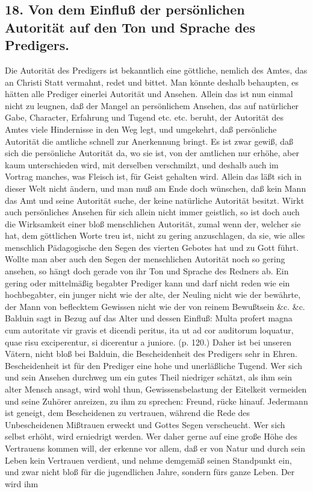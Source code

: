 \subsection*{18. Von dem Einfluß der persönlichen Autorität auf den Ton und Sprache des Predigers.}

Die Autorität des Predigers ist bekanntlich eine göttliche, nemlich des Amtes, das an Christi Statt vermahnt, redet und bittet. Man könnte deshalb behaupten, es hätten alle Prediger einerlei Autorität und Ansehen. Allein das ist nun einmal nicht zu leugnen, daß der Mangel an persönlichem Ansehen, das auf natürlicher Gabe, Character, Erfahrung und Tugend etc. etc. beruht, der Autorität des Amtes viele Hindernisse in den Weg legt, und umgekehrt, daß persönliche Autorität die amtliche schnell zur Anerkennung bringt. Es ist zwar gewiß, daß sich die persönliche Autorität da, wo sie ist, von der amtlichen nur erhöhe, aber kaum unterschieden wird, mit derselben verschmilzt, und deshalb auch im Vortrag manches, was Fleisch ist, für Geist gehalten wird. Allein das läßt sich in dieser Welt nicht ändern, und man muß am Ende doch wünschen, daß kein Mann das Amt und seine Autorität suche, der keine natürliche Autorität besitzt. Wirkt auch persönliches Ansehen für sich allein nicht immer geistlich, so ist doch auch die Wirksamkeit einer bloß menschlichen Autorität, zumal wenn der, welcher sie hat, dem göttlichen Worte treu ist, nicht zu
gering anzuschlagen, da sie, wie alles menschlich Pädagogische den Segen des vierten Gebotes hat und zu Gott führt. Wollte man aber auch den Segen der menschlichen Autorität noch so gering ansehen, so hängt doch gerade von ihr Ton und Sprache des Redners ab. Ein gering oder mittelmäßig begabter Prediger kann und darf nicht reden wie ein hochbegabter, ein junger nicht wie der alte, der Neuling nicht wie der bewährte, der Mann von beflecktem Gewissen nicht wie der von reinem Bewußtsein \&c. \&c. Balduin sagt in Bezug auf das Alter und dessen Einfluß: Multa profert magna cum autoritate vir gravis et dicendi peritus, ita ut ad cor auditorum loquatur, quae risu exciperentur, si dicerentur a juniore. (p. 120.) Daher ist bei unseren Vätern, nicht bloß bei Balduin, die Bescheidenheit des Predigers sehr in Ehren. Bescheidenheit ist für den Prediger eine hohe und unerläßliche Tugend. Wer sich und sein Ansehen durchweg um ein gutes Theil niedriger schätzt, als ihm sein alter Mensch ansagt, wird wohl thun, Gewissensbelastung der Eitelkeit vermeiden und seine Zuhörer anreizen, zu ihm zu sprechen: Freund, rücke hinauf. Jedermann ist geneigt, dem Bescheidenen zu vertrauen, während die Rede des Unbescheidenen Mißtrauen erweckt und Gottes Segen verscheucht. Wer sich selbst erhöht, wird erniedrigt werden. Wer daher gerne auf eine große Höhe des Vertrauens kommen will, der erkenne vor allem, daß er von Natur und durch sein Leben kein Vertrauen verdient, und nehme demgemäß seinen Standpunkt ein, und zwar nicht bloß für die jugendlichen Jahre, sondern fürs ganze Leben. Der wird ihm
